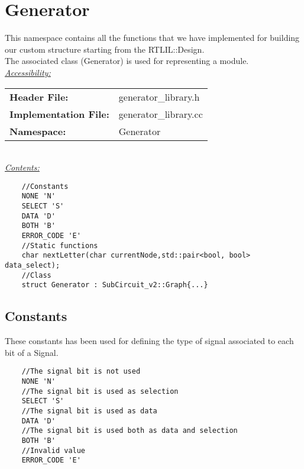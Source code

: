 \documentclass{article}
\newcommand{\sectionbreak}{\clearpage}
\begin{document}
\sectionbreak{\clearpage}


\section{Generator}

This namespace contains all the functions that we have implemented for building our custom structure starting from the RTLIL::Design.\\
The associated class (Generator) is used for representing a module.\\

\underline{\textit{\underline{Accessibility: }}}\\

\begin{tabular}{ll}
	\textbf{Header File:} & generator\_library.h\\
	\textbf{Implementation File:} & generator\_library.cc\\
	\textbf{Namespace: } & Generator\\
\end{tabular}\\

\underline{\textit{\underline{Contents: }}}\\

\begin{mdframed}[hidealllines=true, backgroundcolor=green!10]
	\begin{lstlisting}
	//Constants
	NONE 'N'
	SELECT 'S'
	DATA 'D'
	BOTH 'B'
	ERROR_CODE 'E'
	//Static functions
	char nextLetter(char currentNode,std::pair<bool, bool> data_select);
	//Class
	struct Generator : SubCircuit_v2::Graph{...}
	\end{lstlisting}
\end{mdframed}

\subsection{Constants}

These constants has been used for defining the type of signal associated to each bit of a Signal.

\begin{mdframed}[hidealllines=true, backgroundcolor=green!10]
	\begin{lstlisting}
	//The signal bit is not used
	NONE 'N'
	//The signal bit is used as selection
	SELECT 'S'
	//The signal bit is used as data
	DATA 'D'
	//The signal bit is used both as data and selection
	BOTH 'B'
	//Invalid value
	ERROR_CODE 'E'
	\end{lstlisting}
\end{mdframed}
\end{document}
